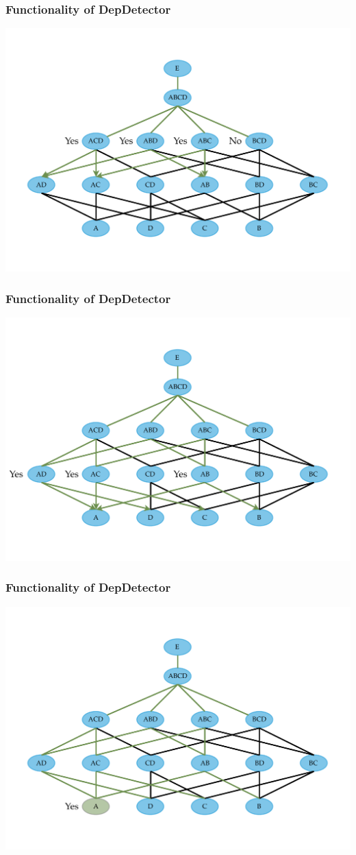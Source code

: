 \documentclass{beamer}
\begin{document}
\begin{frame}
    \frametitle{Functionality of DepDetector}
    \includegraphics[width=.95\textwidth]{min-dep-step-6.pdf}
\end{frame}

\begin{frame}
    \frametitle{Functionality of DepDetector}
    \includegraphics[width=.95\textwidth]{min-dep-step-7.pdf}
\end{frame}

\begin{frame}
    \frametitle{Functionality of DepDetector}
    \includegraphics[width=.95\textwidth]{min-dep-step-8.pdf}
\end{frame}
\end{document}
